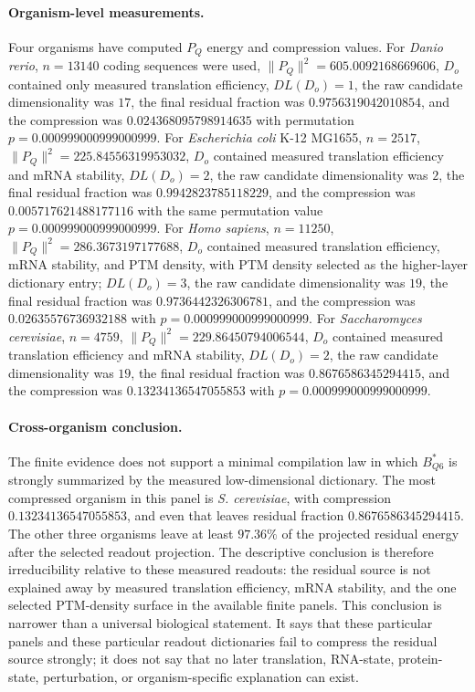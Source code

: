 \paragraph{Organism-level measurements.}
Four organisms have computed $P_Q$ energy and compression values.  For \emph{Danio rerio}, $n=13140$ coding sequences were used, $\lVert P_Q\rVert^2=605.0092168669606$, $D_o$ contained only measured translation efficiency, $DL(D_o)=1$, the raw candidate dimensionality was $17$, the final residual fraction was $0.9756319042010854$, and the compression was $0.024368095798914635$ with permutation $p=0.000999000999000999$.  For \emph{Escherichia coli} K-12 MG1655, $n=2517$, $\lVert P_Q\rVert^2=225.84556319953032$, $D_o$ contained measured translation efficiency and mRNA stability, $DL(D_o)=2$, the raw candidate dimensionality was $2$, the final residual fraction was $0.9942823785118229$, and the compression was $0.005717621488177116$ with the same permutation value $p=0.000999000999000999$.  For \emph{Homo sapiens}, $n=11250$, $\lVert P_Q\rVert^2=286.3673197177688$, $D_o$ contained measured translation efficiency, mRNA stability, and PTM density, with PTM density selected as the higher-layer dictionary entry; $DL(D_o)=3$, the raw candidate dimensionality was $19$, the final residual fraction was $0.9736442326306781$, and the compression was $0.02635576736932188$ with $p=0.000999000999000999$.  For \emph{Saccharomyces cerevisiae}, $n=4759$, $\lVert P_Q\rVert^2=229.86450794006544$, $D_o$ contained measured translation efficiency and mRNA stability, $DL(D_o)=2$, the raw candidate dimensionality was $19$, the final residual fraction was $0.8676586345294415$, and the compression was $0.13234136547055853$ with $p=0.000999000999000999$.

\paragraph{Cross-organism conclusion.}
The finite evidence does not support a minimal compilation law in which $B^*_{Q6}$ is strongly summarized by the measured low-dimensional dictionary.  The most compressed organism in this panel is \emph{S. cerevisiae}, with compression $0.13234136547055853$, and even that leaves residual fraction $0.8676586345294415$.  The other three organisms leave at least $97.36\%$ of the projected residual energy after the selected readout projection.  The descriptive conclusion is therefore irreducibility relative to these measured readouts: the residual source is not explained away by measured translation efficiency, mRNA stability, and the one selected PTM-density surface in the available finite panels.  This conclusion is narrower than a universal biological statement.  It says that these particular panels and these particular readout dictionaries fail to compress the residual source strongly; it does not say that no later translation, RNA-state, protein-state, perturbation, or organism-specific explanation can exist.

